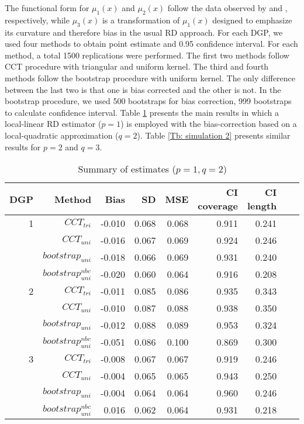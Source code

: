\documentclass[12pt,fleqn]{article}
\begin{document}
The functional form for $\mu_{1}(x)$ and $\mu_{2}(x)$ follow the data observed by \cite{lee2008} and \cite{ludwig2007}, respectively, while $\mu_{3}(x)$ is a transformation of $\mu_{1}(x)$ designed to emphasize its curvature and therefore bias in the usual RD approach. For each DGP, we used four methods to obtain point estimate and 0.95 confidence interval. For each method, a total 1500 replications were performed. The first two methods follow CCT procedure with triangular and uniform kernel. The third and fourth methods follow the bootstrap procedure with uniform kernel. The only difference between the last two is that one is bias corrected and the other is not. In the bootstrap procedure, we used 500 bootstraps for bias correction, 999 bootstraps to calculate confidence interval. Table \ref{Tb: simulation 1} presents the main results in which a local-linear RD estimator ($p=1$) is employed with the bias-correction based on a local-quadratic approximation ($q=2$). Table \ref{Tb: simulation 2} presents similar results for $p=2$ and $q=3$.

\begin{table}[t]
\centering
\begin{tabular}{rrrrrrrrr}
  \toprule
	DGP & Method    & Bias    & SD    & MSE   & CI coverage & CI length \\
  \midrule
	1 & $CCT_{tri}$ & -0.010 & 0.068 & 0.068 & 0.911 & 0.241 \\ 
	  & $CCT_{uni}$ & -0.016 & 0.067 & 0.069 & 0.924 & 0.246 \\ 
	  & $bootstrap_{uni}$       & -0.018 & 0.066 & 0.069 & 0.931 & 0.240 \\ 
	  & $bootstrap_{uni}^{nbc}$ & -0.020 & 0.060 & 0.064 & 0.916 & 0.208 \\
	\midrule
	2 & $CCT_{tri}$ & -0.011 & 0.085 & 0.086 & 0.935 & 0.343 \\ 
	  & $CCT_{uni}$ & -0.010 & 0.087 & 0.088 & 0.938 & 0.350 \\ 
	  & $bootstrap_{uni}$       & -0.012 & 0.088 & 0.089 & 0.953 & 0.324 \\ 
	  & $bootstrap_{uni}^{nbc}$ & -0.051 & 0.086 & 0.100 & 0.869 & 0.300 \\ 
	\midrule
	3 & $CCT_{tri}$ & -0.008 & 0.067 & 0.067 & 0.919 & 0.246 \\ 
	  & $CCT_{uni}$ & -0.004 & 0.065 & 0.065 & 0.943 & 0.250 \\ 
	  & $bootstrap_{uni}$       & -0.004 & 0.064 & 0.064 & 0.960 & 0.246 \\ 
	  & $bootstrap_{uni}^{nbc}$ & 0.016 & 0.062 & 0.064 & 0.931 & 0.218 \\ 
  \bottomrule
\end{tabular}
\caption{Summary of estimates ($p = 1, q = 2$)}
\label{Tb: simulation 1}
\end{table}
\end{document}
